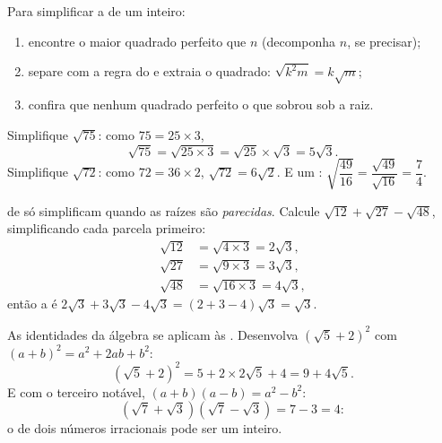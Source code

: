 \begin{method}\label{met:g9:sqrt:simplify}
Para simplificar a  de um inteiro:
\begin{enumerate}
  \item encontre o maior quadrado perfeito que  $n$ (decomponha
        $n$, se precisar);
  \item separe com a regra do  e extraia o quadrado:
        $\sqrt{k^2 m} = k\sqrt m$;
  \item confira que nenhum quadrado perfeito  o que sobrou sob a
        raiz.
\end{enumerate}
\end{method}

\begin{example}\label{ex:g9:sqrt:simplify}
Simplifique $\sqrt{75}$: como $75 = 25 \times 3$,
\[
\sqrt{75} = \sqrt{25 \times 3} = \sqrt{25} \times \sqrt 3 = 5\sqrt3 .
\]
Simplifique $\sqrt{72}$: como $72 = 36 \times 2$,
$\sqrt{72} = 6\sqrt2$. E um :
$\sqrt{\dfrac{49}{16}} = \dfrac{\sqrt{49}}{\sqrt{16}} = \dfrac74$.
\end{example}

\begin{example}\label{ex:g9:sqrt:add}
 de  só simplificam quando as raízes são
\emph{parecidas}. Calcule $\sqrt{12} + \sqrt{27} - \sqrt{48}$,
simplificando cada parcela primeiro:
\begin{align*}
\sqrt{12} &= \sqrt{4 \times 3} = 2\sqrt3, \\
\sqrt{27} &= \sqrt{9 \times 3} = 3\sqrt3, \\
\sqrt{48} &= \sqrt{16 \times 3} = 4\sqrt3,
\end{align*}
então a  é
$2\sqrt3 + 3\sqrt3 - 4\sqrt3 = (2 + 3 - 4)\sqrt3 = \sqrt3$.
\end{example}

\begin{example}\label{ex:g9:sqrt:expand}
As identidades da álgebra se aplicam às . Desenvolva
$\left(\sqrt5 + 2\right)^2$ com $(a+b)^2 = a^2 + 2ab + b^2$:
\[
\left(\sqrt5 + 2\right)^2 = 5 + 2 \times 2\sqrt5 + 4 = 9 + 4\sqrt5 .
\]
E com o terceiro  notável, $(a+b)(a-b) = a^2 - b^2$:
\[
\left(\sqrt7 + \sqrt3\right)\left(\sqrt7 - \sqrt3\right) = 7 - 3 = 4 :
\]
o  de dois números irracionais pode ser um inteiro.
\end{example}

